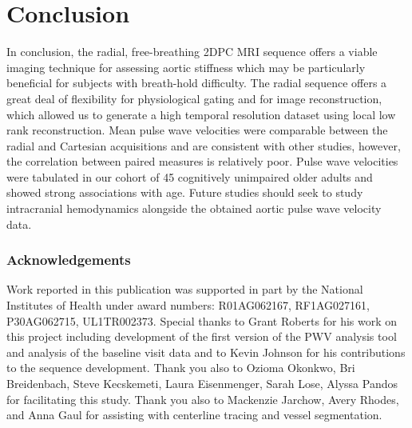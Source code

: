 \section{Conclusion}\label{sec:life_conclusion}
In conclusion, the radial, free-breathing 2DPC MRI sequence offers a viable imaging technique for assessing aortic stiffness which may be particularly beneficial for subjects with breath-hold difficulty. The radial sequence offers a great deal of flexibility for physiological gating and for image reconstruction, which allowed us to generate a high temporal resolution dataset using local low rank reconstruction. Mean pulse wave velocities were comparable between the radial and Cartesian acquisitions and are consistent with other studies, however, the correlation between paired measures is relatively poor. Pulse wave velocities were tabulated in our cohort of 45 cognitively unimpaired older adults and showed strong associations with age. Future studies should seek to study intracranial hemodynamics alongside the obtained aortic pulse wave velocity data.

\subsubsection{Acknowledgements}
Work reported in this publication was supported in part by the National Institutes of Health under award numbers: R01AG062167, RF1AG027161, P30AG062715, UL1TR002373. Special thanks to Grant Roberts for his work on this project including development of the first version of the PWV analysis tool and analysis of the baseline visit data and to Kevin Johnson for his contributions to the sequence development. Thank you also to Ozioma Okonkwo, Bri Breidenbach, Steve Kecskemeti, Laura Eisenmenger, Sarah Lose, Alyssa Pandos for facilitating this study. Thank you also to Mackenzie Jarchow, Avery Rhodes, and Anna Gaul for assisting with centerline tracing and vessel segmentation.